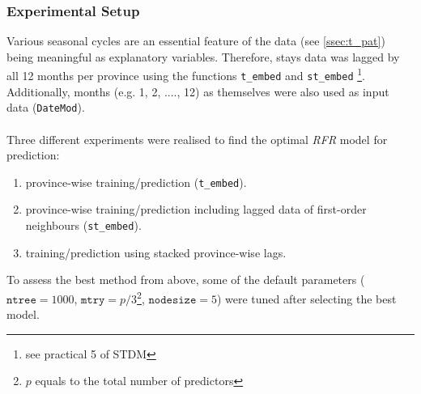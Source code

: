 \documentclass[a4paper,reqno,]{article}
\begin{document}
\subsubsection{Experimental Setup}
\label{sssec:prepro}
Various seasonal cycles are an essential feature of the data (see \ref{ssec:t_pat}) being meaningful as explanatory variables. Therefore, stays data was lagged by all 12 months per province using the functions \texttt{t\_embed} and \texttt{st\_embed} \footnote{see practical 5 of STDM}. Additionally, months (e.g. 1, 2, ...., 12) as themselves were also used as input data (\texttt{DateMod}). 
\\
\\
Three different experiments were realised to find the optimal \textit{RFR} model for prediction:%
\begin{enumerate}
\item province-wise training/prediction (\texttt{t\_embed}). 
\item province-wise training/prediction including lagged data of first-order neighbours (\texttt{st\_embed}).
\item training/prediction using stacked province-wise lags. 
\end{enumerate}
To assess the best method from above, some of the default parameters  ($\texttt{ntree}=1000$, $\texttt{mtry}=p/3$\footnote{$p$ equals to the total number of predictors}, $\texttt{nodesize}=5$) were tuned after selecting the best model. 
\end{document}
